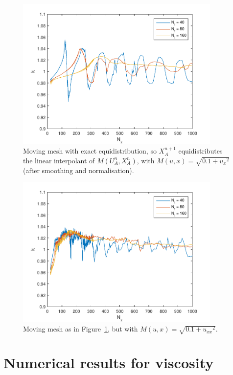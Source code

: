 \documentclass{article}
\begin{document}
\begin{figure}[htbp]
\centering
  \includegraphics[width=0.9\textwidth]{alan4-k.pdf}
  \caption{Moving mesh with exact equidistribution, so $X_A^{n+1}$
    equidistributes the linear interpolant of $M(U^n_A,X^n_A)$, with
    $M(u,x) = \sqrt{0.1 + {u_x}^2}$ (after smoothing and normalisation).
  \label{fig:alan4-k}}
\end{figure}
\begin{figure}[hbtp]
\centering
  \includegraphics[width=0.9\textwidth]{alan7-k.pdf}
  \caption{Moving mesh as in Figure~\ref{fig:alan4-k}, but with
  $M(u,x) = \sqrt{0.1 + {u_{xx}}^2}$.
  \label{fig:alan7-k}}
\end{figure}

\clearpage
\section{Numerical results for viscosity}
\end{document}
